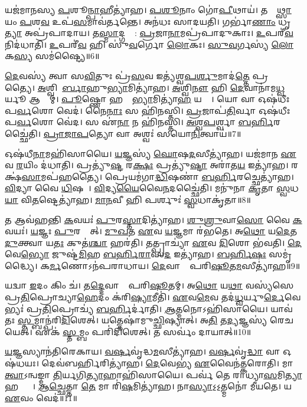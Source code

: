 𑌯𑌜॑𑌮𑌾𑌨𑌸𑍍𑌯 \ul{𑌪}𑌶𑍂\ul{𑌨𑍍𑌪𑌾}𑌹𑍀𑌤𑍍𑌯𑌾॑𑌹।
\ul{𑌪}\ul{𑌶𑍂}𑌨𑌾𑌂 𑌗𑍋॑\ul{𑌪𑍀}𑌥𑌾𑌯॑।
𑌤𑌸𑍍𑌮𑌾᳚\ul{𑌥𑍍𑌸𑌾}𑌯𑌂 \ul{𑌪}𑌶\ul{𑌵} 𑌉𑌪॑\ul{𑌸}𑌮𑌾𑌵॑𑌰𑍍𑌤𑌨𑍍𑌤𑍇।
𑌅𑌨॑𑌧𑌃 𑌸𑌾𑌦𑌯𑌤𑌿।
𑌗𑌰𑍍𑌭𑌾॑\ul{𑌣𑌾𑌂} 𑌧𑍃\ul{𑌤𑍍𑌯𑌾} 𑌅𑌪𑍍𑌰॑𑌪𑌾𑌦𑌾𑌯।
𑌤\ul{𑌸𑍍𑌮𑌾}𑌦𑍍𑌗𑌰𑍍𑌭𑌾᳚: \ul{𑌪𑍍𑌰}𑌜𑌾\ul{𑌨𑌾}𑌮𑌪𑍍𑌰॑𑌪𑌾𑌦𑍁𑌕𑌾𑌃।
\ul{𑌉}𑌪𑌰𑍀॑\ul{𑌵} 𑌨𑌿𑌦॑𑌧𑌾𑌤𑌿।
\ul{𑌉}𑌪𑌰𑍀॑\ul{𑌵} 𑌹𑌿 𑌸𑍁॑\ul{𑌵}𑌰𑍍𑌗𑍋 \ul{𑌲𑍋}𑌕𑌃।
\ul{𑌸𑍁}\ul{𑌵}𑌰𑍍𑌗𑌸𑍍𑌯॑ \ul{𑌲𑍋}𑌕\ul{𑌸𑍍𑌯} 𑌸𑌮॑𑌷𑍍𑌟𑍍𑌯𑍈॥6॥\anuvakamend[\ul{𑌪}𑌶𑌵𑌃॑ 𑌕𑌰𑍋𑌤𑌿 \ul{𑌪}𑌶𑌵𑍋॑ 𑌦𑍇𑌵\ul{𑌭𑌾}𑌗𑌮𑌿𑌤𑍍𑌯𑌾॑𑌹 𑌕𑌰𑍋\ul{𑌤𑌿} 𑌨𑌵॑ 𑌚]

\ul{𑌦𑍇}𑌵𑌸𑍍𑌯॑ 𑌤𑍍𑌵𑌾 𑌸\ul{𑌵𑌿}𑌤𑍁𑌃 𑌪𑍍𑌰॑\ul{𑌸}𑌵 𑌇𑌤𑍍𑌯॑𑌶𑍍𑌵\ul{𑌪}\ul{𑌰𑍍}𑌶𑍁𑌮𑌾𑌦॑\ul{𑌤𑍍𑌤𑍇} 𑌪𑍍𑌰𑌸𑍂᳚𑌤𑍍𑌯𑍈।
\ul{𑌅}𑌶𑍍𑌵𑌿𑌨𑍋᳚\ul{𑌰𑍍𑌬𑌾}𑌹𑍁\ul{𑌭𑍍𑌯𑌾}𑌮𑌿𑌤𑍍𑌯𑌾॑𑌹।
\ul{𑌅}𑌶𑍍𑌵𑌿\ul{𑌨𑍗} 𑌹𑌿 \ul{𑌦𑍇}𑌵𑌾𑌨𑌾॑𑌮\ul{𑌧𑍍𑌵}𑌰𑍍𑌯𑍂 𑌆𑌸𑍍𑌤𑌾᳚𑌮𑍍।
\ul{𑌪𑍂}𑌷𑍍𑌣𑍋 𑌹𑌸𑍍𑌤𑌾᳚\ul{𑌭𑍍𑌯𑌾}𑌮𑌿𑌤𑍍𑌯𑌾॑\ul{𑌹} 𑌯𑌤𑍍𑌯𑍈᳚।
𑌯𑍋 𑌵𑌾 𑌓𑌷॑𑌧𑍀𑌃 𑌪\ul{𑌰𑍍𑌵}𑌶𑍋 𑌵𑍇𑌦॑।
𑌨𑍈\ul{𑌨𑌾𑌃} 𑌸 𑌹𑌿॑𑌨𑌸𑍍𑌤𑌿।
\ul{𑌪𑍍𑌰}𑌜𑌾𑌪॑\ul{𑌤𑌿}𑌰𑍍𑌵𑌾 𑌓𑌷॑𑌧𑍀𑌃 𑌪\ul{𑌰𑍍𑌵}𑌶𑍋 𑌵𑍇॑𑌦।
𑌸 𑌏॑\ul{𑌨𑌾} 𑌨 𑌹𑌿॑𑌨𑌸𑍍𑌤𑌿।
\ul{𑌅}\ul{𑌶𑍍𑌵}\ul{𑌪}𑌰𑍍𑌶𑍍𑌵𑌾 \ul{𑌬}\ul{𑌰𑍍}𑌹𑌿𑌰𑌚𑍍𑌛𑍈॑𑌤𑌿।
\ul{𑌪𑍍𑌰𑌾}\ul{𑌜𑌾}\ul{𑌪}𑌤𑍍𑌯𑍋 𑌵𑌾 𑌅𑌶𑍍𑌵𑌃॑ 𑌸𑌯𑍋\ul{𑌨𑌿}𑌤𑍍𑌵𑌾𑌯॑॥7॥

𑌓𑌷॑𑌧𑍀\ul{𑌨𑌾}𑌮𑌹𑌿॑𑌸𑌾𑌯𑍈।
\ul{𑌯}𑌜𑍍𑌞𑌸𑍍𑌯॑ \ul{𑌘𑍋}𑌷\ul{𑌦}𑌸𑍀𑌤𑍍𑌯𑌾॑𑌹।
𑌯𑌜॑𑌮𑌾𑌨 \ul{𑌏}𑌵 \ul{𑌰}𑌯𑌿𑌂 𑌦॑𑌧𑌾𑌤𑌿।
𑌪𑍍𑌰𑌤𑍍𑌯𑍁॑\ul{𑌷𑍍𑌟}\ul{} 𑌰\ul{𑌕𑍍𑌷𑌃} 𑌪𑍍𑌰𑌤𑍍𑌯𑍁॑\ul{𑌷𑍍𑌟𑌾} 𑌅𑌰𑌾॑𑌤\ul{𑌯} 𑌇𑌤𑍍𑌯𑌾॑𑌹।
𑌰𑌕𑍍𑌷॑\ul{𑌸𑌾}𑌮𑌪॑𑌹𑌤𑍍𑌯𑍈।
𑌪𑍍𑌰𑍇𑌯𑌮॑𑌗𑌾\ul{𑌦𑍍𑌧𑌿}𑌷𑌣𑌾॑ \ul{𑌬}\ul{𑌰𑍍}𑌹𑌿𑌰𑌚𑍍𑌛𑍇𑌤𑍍𑌯𑌾॑𑌹।
\ul{𑌵𑌿}𑌦𑍍𑌯𑌾 𑌵𑍈 \ul{𑌧𑌿}𑌷𑌣𑌾᳚।
\ul{𑌵𑌿}𑌦𑍍𑌯\ul{𑌯𑍈}𑌵𑍈\ul{𑌨}𑌦𑌚𑍍𑌛𑍈॑𑌤𑌿।
𑌮𑌨𑍁॑𑌨𑌾 \ul{𑌕𑍃}𑌤𑌾 \ul{𑌸𑍍𑌵}𑌧\ul{𑌯𑌾} 𑌵𑌿\ul{𑌤}𑌷𑍍𑌟𑍇𑌤𑍍𑌯𑌾॑𑌹।
\ul{𑌮𑌾}\ul{𑌨}𑌵𑍀 𑌹𑌿 𑌪𑌰𑍍\mbox{}𑌶𑍁𑌃॑ \ul{𑌸𑍍𑌵}𑌧𑌾𑌕𑍃॑𑌤𑌾॥8॥

𑌤 𑌆𑌵॑𑌹𑌨𑍍𑌤𑌿 \ul{𑌕}𑌵𑌯𑌃॑ \ul{𑌪𑍁}𑌰\ul{𑌸𑍍𑌤𑌾}𑌦𑌿𑌤𑍍𑌯𑌾॑𑌹।
\ul{𑌶𑍁}\ul{𑌶𑍍𑌰𑍁}𑌵𑌾\ul{𑌸𑍋} 𑌵𑍈 \ul{𑌕}𑌵𑌯𑌃॑।
\ul{𑌯}𑌜𑍍𑌞𑌃 \ul{𑌪𑍁}𑌰𑌸𑍍𑌤𑌾᳚𑌤𑍍।
\ul{𑌮𑍁}\ul{𑌖}𑌤 \ul{𑌏}𑌵 \ul{𑌯}𑌜𑍍𑌞𑌮𑌾 𑌰॑𑌭𑌤𑍇।
𑌅\ul{𑌥𑍋} 𑌯\ul{𑌦𑍇}𑌤\ul{𑌦𑍁}𑌕𑍍𑌤𑍍𑌵𑌾 𑌯\ul{𑌤𑌃} 𑌕𑍁𑌤॑\ul{𑌶𑍍𑌚𑌾} 𑌹𑌰॑𑌤𑌿।
𑌤𑌤𑍍𑌪𑍍𑌰𑌾𑌚𑍍𑌯𑌾॑ \ul{𑌏}𑌵 \ul{𑌦𑌿}𑌶𑍋 𑌭॑𑌵𑌤𑌿।
\ul{𑌦𑍇}𑌵𑍇\ul{𑌭𑍍𑌯𑍋} 𑌜𑍁𑌷𑍍𑌟॑\ul{𑌮𑌿}𑌹 \ul{𑌬}\ul{𑌰𑍍}𑌹𑌿\ul{𑌰𑌾}𑌸\ul{𑌦} 𑌇𑌤𑍍𑌯𑌾॑𑌹।
\ul{𑌬}\ul{𑌰𑍍}\mbox{}𑌹𑌿\ul{𑌷𑌃} 𑌸𑌮𑍃॑𑌦𑍍𑌧𑍍𑌯𑍈।
𑌕\ul{𑌰𑍍𑌮}𑌣𑍋\-𑌽𑌨॑𑌪𑌰𑌾𑌧𑌾𑌯।
\ul{𑌦𑍇}𑌵𑌾𑌨𑌾𑌂᳚ 𑌪𑌰𑌿\ul{𑌷𑍂}𑌤\ul{𑌮}𑌸𑍀𑌤𑍍𑌯𑌾॑𑌹॥9॥

𑌯𑌦𑍍𑌵𑌾 \ul{𑌇}𑌦𑌂 𑌕𑌿𑌂 𑌚॑।
𑌤\ul{𑌦𑍍𑌦𑍇}𑌵𑌾𑌨𑌾𑌂᳚ 𑌪𑌰𑌿\ul{𑌷𑍂}𑌤𑌮𑍍।
𑌅\ul{𑌥𑍋} 𑌯\ul{𑌥𑌾} 𑌵𑌸𑍍𑌯॑𑌸𑍇 𑌪𑍍𑌰\ul{𑌤𑌿}𑌪𑍍𑌰𑍋𑌚𑍍𑌯𑌾\ul{𑌹𑍇}𑌦𑌂 𑌕॑𑌰𑌿\ul{𑌷𑍍𑌯𑌾}𑌮𑍀𑌤𑌿॑।
\ul{𑌏}𑌵\ul{𑌮𑍇}𑌵 𑌤𑌦॑\ul{𑌧𑍍𑌵}𑌰𑍍𑌯𑍁\ul{𑌰𑍍𑌦𑍇}𑌵𑍇𑌭𑍍𑌯𑌃॑ 𑌪𑍍𑌰\ul{𑌤𑌿}𑌪𑍍𑌰𑍋𑌚𑍍𑌯॑ \ul{𑌬}\ul{𑌰𑍍}𑌹𑌿𑌰𑍍𑌦𑌾॑𑌤𑌿।
\ul{𑌆}𑌤𑍍𑌮𑌨𑍋\-𑌽𑌹𑌿॑𑌸𑌾𑌯𑍈।
𑌯𑌾𑌵॑𑌤𑌃 \ul{𑌸𑍍𑌤}𑌮𑍍𑌬𑌾𑌨𑍍𑌪॑𑌰𑌿\ul{𑌦𑌿}𑌶𑍇𑌤𑍍।
𑌯𑌤𑍍𑌤𑍇𑌷𑌾॑𑌮𑍁\ul{𑌚𑍍𑌛𑌿}\ul{}𑌷𑍍𑌯𑌾𑌤𑍍।
𑌅\ul{𑌤𑌿} 𑌤\ul{𑌦𑍍𑌯}𑌜𑍍𑌞𑌸𑍍𑌯॑ 𑌰𑍇𑌚𑌯𑍇𑌤𑍍।
𑌏𑌕॑ \ul{𑌸𑍍𑌤}𑌮𑍍𑌬𑌂 𑌪𑌰𑌿॑𑌦𑌿𑌶𑍇𑌤𑍍।
𑌤 𑌸𑌰𑍍𑌵𑌂॑ 𑌦𑌾𑌯𑌾𑌤𑍍॥10॥

\ul{𑌯}𑌜𑍍𑌞𑌸𑍍𑌯𑌾𑌨॑𑌤𑌿𑌰𑍇𑌕𑌾𑌯।
\ul{𑌵}\ul{𑌰𑍍}𑌷𑌵𑍃॑𑌦𑍍𑌧\ul{𑌮}𑌸𑍀𑌤𑍍𑌯𑌾॑𑌹।
\ul{𑌵}\ul{𑌰𑍍}𑌷𑌵𑍃॑\ul{𑌦𑍍𑌧𑌾} 𑌵𑌾 𑌓𑌷॑𑌧𑌯𑌃।
𑌦𑍇𑌵॑𑌬𑌰𑍍\mbox{}\ul{𑌹𑌿}𑌰𑌿𑌤𑍍𑌯𑌾॑𑌹।
\ul{𑌦𑍇}𑌵𑍇𑌭𑍍𑌯॑ \ul{𑌏}𑌵𑍈𑌨॑𑌤𑍍𑌕𑌰𑍋𑌤𑌿।
𑌮𑌾 \ul{𑌤𑍍𑌵𑌾}\-𑌽𑌨𑍍𑌵𑌙𑍍𑌮𑌾 \ul{𑌤𑌿}𑌰𑍍𑌯𑌗𑌿\ul{𑌤𑍍𑌯𑌾}𑌹𑌾𑌹𑌿॑𑌸𑌾𑌯𑍈।
𑌪𑌰𑍍𑌵॑ 𑌤𑍇 𑌰𑌾𑌧𑍍𑌯𑌾\ul{𑌸}𑌮𑌿\ul{𑌤𑍍𑌯𑌾}𑌹𑌰𑍍𑌧𑍍𑌯𑍈᳚।
\ul{𑌆}\ul{𑌚𑍍𑌛𑍇}𑌤𑍍𑌤𑌾 \ul{𑌤𑍇} 𑌮𑌾 𑌰𑌿॑\ul{𑌷}𑌮𑌿𑌤𑍍𑌯𑌾॑𑌹।
𑌨𑌾\ul{𑌸𑍍𑌯𑌾}𑌽॒𑌽॒𑌤𑍍𑌮𑌨𑍋॑ 𑌮𑍀𑌯𑌤𑍇।
𑌯 \ul{𑌏}𑌵𑌂 𑌵𑍇𑌦॑॥11॥

